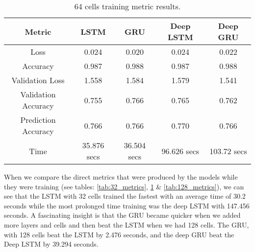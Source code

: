 \documentclass[a4paper,10pt]{article}
\begin{document}
	\begin{table}[b]
		\centering
		\small
		\begin{tabular}[t]{ | c | c | c | c | c | }
			\hline
			Metric              & LSTM  & GRU   & Deep LSTM & Deep GRU \\ 
			\hline
			Loss                & 0.024 & 0.020 & 0.024     & 0.022 \\ 
			\hline
			Accuracy            & 0.987 & 0.988 & 0.987     & 0.988  \\ 
			\hline
			Validation Loss     & 1.558 & 1.584 & 1.579     & 1.541 \\
			\hline
			Validation Accuracy & 0.755 & 0.766 & 0.765     & 0.762 \\
			\hline
			Prediction Accuracy & 0.766     & 0.766 & 0.770     & 0.766  \\ 
			\hline
			Time & 35.876 secs & 36.504 secs & 96.626 secs & 103.72 secs \\ 
			\hline
		\end{tabular}
		\caption{64 cells training metric results.}
		\label{tab:64_metrics}
	\end{table}%
	When we compare the direct metrics that were produced by the models while they were training (see tables: \ref{tab:32_metrics}, \ref{tab:64_metrics} \& \ref{tab:128_metrics}), we can see that the LSTM with 32 cells trained the fastest with an average time of 30.2 seconds while the most prolonged time training was the deep LSTM with 147.456 seconds. A fascinating insight is that the GRU became quicker when we added more layers and cells and then beat the LSTM when we had 128 cells. The GRU, with 128 cells beat the LSTM by 2.476 seconds, and the deep GRU beat the Deep LSTM by 39.294 seconds.

	

	
\end{document}
